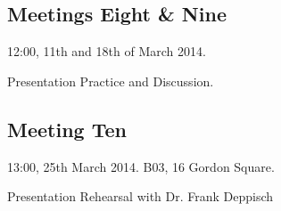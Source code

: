 \subsection{Meetings Eight \& Nine}

12:00, 11th and 18th of March 2014.

Presentation Practice and Discussion.

\subsection{Meeting Ten}

13:00, 25th March 2014. B03, 16 Gordon Square.

Presentation Rehearsal with Dr. Frank Deppisch
